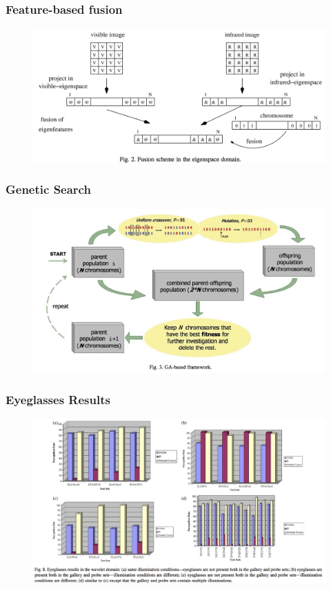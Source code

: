 \documentclass{beamer}
\begin{document}
\begin{frame}
\frametitle{Feature-based fusion}
\begin{figure}
\includegraphics[width=\textwidth]{featurefusion}
\end{figure}
\end{frame}

\begin{frame}
\frametitle{Genetic Search}
\begin{figure}
\includegraphics[width=\textwidth]{ga}
\end{figure}
\end{frame}

\begin{frame}
\frametitle{Eyeglasses Results}
\begin{figure}
\includegraphics[width=\textwidth]{eyeglassesresults}
\end{figure}
\end{frame}
\end{document}
